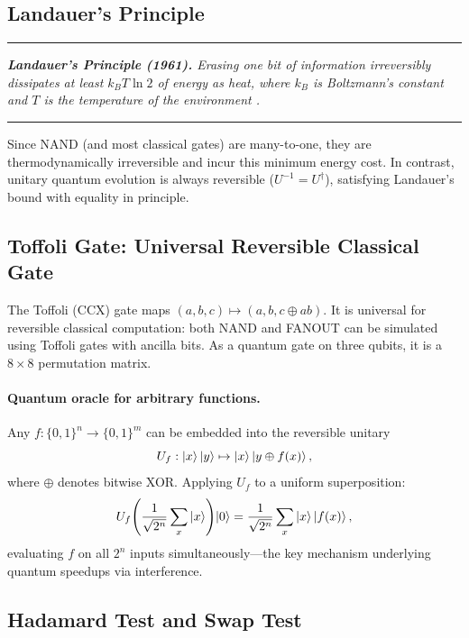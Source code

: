 \documentclass[aps, reprint, twocolumn, superscriptaddress, floatfix]{revtex4-2}
\newenvironment{statement}{%
  \par\addvspace{5pt}%
  \noindent\rule{\linewidth}{0.4pt}\nopagebreak\par\vspace{2pt}%
  \noindent\begingroup\small\itshape}{%
  \endgroup\par\vspace{2pt}\nopagebreak%
  \noindent\rule{\linewidth}{0.4pt}\par\addvspace{5pt}}
\begin{document}
\subsection{Landauer's Principle}
\label{ssec:landauer}

\begin{statement}
\textbf{Landauer's Principle (1961).}
Erasing one bit of information irreversibly dissipates at least $k_B T \ln 2$
of energy as heat, where $k_B$ is Boltzmann's constant and $T$ is the
temperature of the environment \cite{landauer1961irreversibility}.
\end{statement}

Since NAND (and most classical gates) are many-to-one, they are thermodynamically
irreversible and incur this minimum energy cost.  In contrast, unitary quantum
evolution is always reversible ($U^{-1} = U^\dagger$), satisfying Landauer's
bound with equality in principle.

\subsection{Toffoli Gate: Universal Reversible Classical Gate}
\label{ssec:toffoli}

The Toffoli (CCX) gate maps $(a, b, c) \mapsto (a, b, c \oplus ab)$.
It is universal for reversible classical computation: both NAND and FANOUT can be
simulated using Toffoli gates with ancilla bits.  As a quantum gate on three qubits,
it is a $8\times 8$ permutation matrix.

\paragraph{Quantum oracle for arbitrary functions.}
Any $f:\{0,1\}^n \to \{0,1\}^m$ can be embedded into the reversible unitary
\begin{equation}
  U_f : \ket{x}\ket{y} \mapsto \ket{x}\ket{y \oplus f(x)},
  \label{eq:oracle}
\end{equation}
where $\oplus$ denotes bitwise XOR.  Applying $U_f$ to a uniform superposition:
\begin{equation}
  U_f\!\left(\frac{1}{\sqrt{2^n}}\sum_x \ket{x}\right)\!\ket{0}
  = \frac{1}{\sqrt{2^n}}\sum_x \ket{x}\ket{f(x)},
\end{equation}
evaluating $f$ on all $2^n$ inputs simultaneously---the key mechanism underlying
quantum speedups via interference.

\subsection{Hadamard Test and Swap Test}
\label{ssec:hadamard-test}
\end{document}
